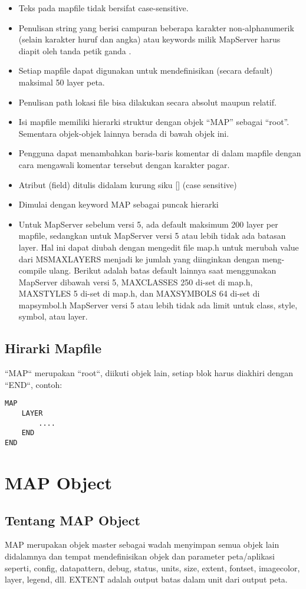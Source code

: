 \begin{itemize}
	\item Teks pada mapfile tidak bersifat case-sensitive.
	\item Penulisan string yang berisi campuran beberapa karakter non-alphanumerik (selain karakter huruf dan angka) atau keywords milik MapServer harus diapit oleh tanda petik ganda .
	\item Setiap mapfile dapat digunakan untuk mendefinisikan (secara default) maksimal 50 layer peta.
	\item Penulisan path lokasi file bisa dilakukan secara absolut maupun relatif.
	\item Isi mapfile memiliki hierarki struktur dengan objek “MAP” sebagai “root”. Sementara objek-objek lainnya berada di bawah objek ini.
	\item Pengguna dapat menambahkan baris-baris komentar di dalam mapfile dengan cara mengawali komentar tersebut dengan karakter pagar.
	\item Atribut (field) ditulis didalam kurung siku [] (case sensitive)
	\item Dimulai dengan keyword MAP sebagai puncak hierarki
	\item Untuk MapServer sebelum versi 5, ada default maksimum 200 layer per mapfile, sedangkan untuk MapServer versi 5 atau lebih tidak ada batasan layer. Hal ini dapat diubah dengan mengedit file map.h untuk merubah value dari MSMAXLAYERS menjadi ke jumlah yang diinginkan dengan meng-compile ulang. Berikut adalah batas default lainnya saat menggunakan MapServer dibawah versi 5, MAXCLASSES 250 di-set di map.h,  MAXSTYLES 5 di-set di map.h, dan MAXSYMBOLS 64 di-set di mapsymbol.h
MapServer versi 5 atau lebih tidak ada limit untuk class,  style, symbol, atau layer.	
\end{itemize}

\subsection{Hirarki Mapfile}
``MAP`` merupakan ``root``, diikuti objek lain, setiap blok harus diakhiri dengan ``END``, 
contoh:
\begin{verbatim}
MAP
	LAYER
		....
	END
END
\end{verbatim}


\section{MAP Object}
\subsection{Tentang MAP Object}
MAP merupakan objek master sebagai wadah menyimpan semua objek lain didalamnya dan tempat mendefinisikan objek dan parameter 
peta/aplikasi seperti, config, datapattern, debug, status, units, size, extent, fontset, imagecolor, layer, legend, dll.
EXTENT adalah output batas dalam unit dari output peta.

